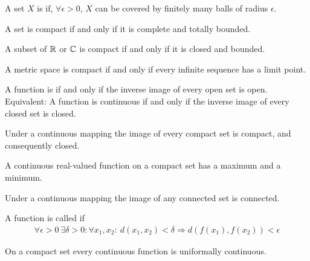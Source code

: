 \begin{definition}
    A set $X$ is  if, $\forall \epsilon >0$, $X$ can be covered by
    finitely many balls of radius $\epsilon$.
\end{definition}

\begin{theorem}
    A set is compact if and only if it is complete and totally bounded.
\end{theorem}

\begin{theorem}
    A subset of $\mathbb{R}$ or $\mathbb{C}$ is compact if and only if it is closed and bounded.
\end{theorem}

\begin{theorem}
    A metric space is compact if and only if every infinite sequence has a limit point.
\end{theorem}

\begin{definition}[Continuity]
    A function is  if and only if the inverse image of every open set is open.
    Equivalent: A function is continuous if and only if the inverse image of every
    closed set is closed.
\end{definition}

\begin{theorem}
    Under a continuous mapping the image of every compact set is compact, and
    consequently closed.
\end{theorem}

\begin{theorem}
    A continuous real-valued function on a compact set has a maximum and a minimum.
\end{theorem}

\begin{theorem}
    Under a continuous mapping the image of any connected set is connected.
\end{theorem}

\begin{definition}
    A function is called  if
    \begin{align*}
        \forall \epsilon > 0 \ \exists \delta > 0 : \forall x_1,x_2 : \ d(x_1,x_2) <
        \delta \Rightarrow d(f(x_1),f(x_2)) < \epsilon
    \end{align*}
\end{definition}

\begin{theorem}
    On a compact set every continuous function is uniformally continuous.
\end{theorem}
